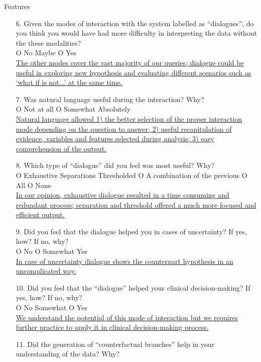 \begin{framed}
	{\Large Features}
	\begin{enumerate}[resume]
		\item[6.] Given the modes of interaction with the system labelled as \enquote{dialogues}, do you think you would have had more difficulty in interpreting the data without the these modalities? \\
		O No  Maybe O Yes\\
		\ul{The other modes cover the vast majority of our queries; dialogue could be useful in exploring new hypothesis and evaluating different scenarios such as `what if is not...' at the same time.}
		\item[7.] Was natural language useful during the interaction?  Why? \\
		O Not at all O Somewhat  Absolutely\\
		\ul{Natural language allowed 1) the better selection of the proper interaction mode depending on the question to answer; 2) useful recapitulation of evidence, variables and features selected during analysis; 3) easy comprehension of the output.}
		\item[8.] Which type of \enquote{dialogue} did you feel was most useful? Why? \\
		O Exhaustive  Separations  Thresholded O A combination of the previous O All O None\\
		\ul{In our opinion, exhaustive dialogue resulted in a time consuming and redundant process; separation and threshold offered a much more focused and efficient output.}
		\item[9.] Did you feel that the dialogue helped you in cases of uncertainty?  If yes, how?  If no, why? \\
		O No O Somewhat  Yes\\
		\ul{In case of uncertainty dialogue shows the counterpart hypothesis in an uncomplicated way.}
		\item[10.] Did you feel that the \enquote{dialogue} helped your clinical decision-making?  If yes, how?  If no, why? \\
		O No  Somewhat O Yes\\
		\ul{We understand the potential of this mode of interaction but we requires further practice to apply it in clinical decision-making process.}
		\item[11.] Did the generation of \enquote{counterfactual branches} help in your understanding of the data?  Why? \\

\end{enumerate}
\end{framed}

